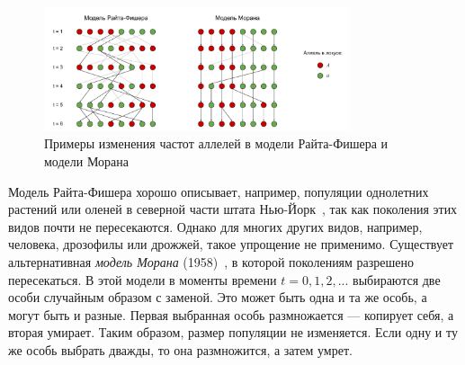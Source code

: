 \begin{figure}[t]
    \includegraphics[width=0.8\textwidth]{images/part1/dem_history/popgen_models.pdf}
    \caption{Примеры изменения частот аллелей в модели Райта-Фишера и модели Морана}\label{fig:part1:deminf:popgen_models}
\end{figure}

Модель Райта-Фишера хорошо описывает, например, популяции однолетних растений или оленей в северной части штата Нью-Йорк~\cite{durrett2008probability}, так как поколения этих видов почти не пересекаются.
Однако для многих других видов, например, человека, дрозофилы или дрожжей, такое упрощение не применимо.
Существует альтернативная \emph{модель Морана} (1958)~\cite{moran1958random}, в которой поколениям разрешено пересекаться.
В этой модели в моменты времени $t = 0, 1, 2,...$  выбираются две особи случайным образом с заменой.
Это может быть одна и та же особь, а могут быть и разные.
Первая выбранная особь размножается --- копирует себя, а вторая умирает.
Таким образом, размер популяции не изменяется.
Если одну и ту же особь выбрать дважды, то она размножится, а затем умрет.

